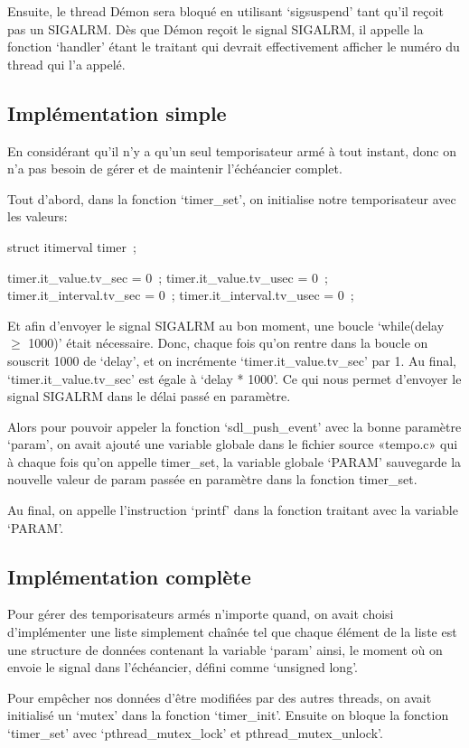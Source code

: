 \documentclass{article}
\begin{document}
Ensuite, le thread Démon sera bloqué en utilisant ‘sigsuspend’ tant qu’il reçoit pas un SIGALRM.
Dès que Démon reçoit le signal SIGALRM, il appelle la fonction ‘handler’ étant le traitant qui devrait effectivement afficher le numéro du thread qui l’a appelé.

\subsection{Implémentation simple}

En considérant qu’il n’y a qu’un seul temporisateur armé à tout instant, donc on n’a pas besoin de gérer et de maintenir l’échéancier complet. 

Tout d’abord, dans la fonction ‘timer\_set’, on initialise notre temporisateur avec les valeurs:

struct itimerval timer ;

timer.it\_value.tv\_sec = 0 ;
timer.it\_value.tv\_usec = 0 ;
timer.it\_interval.tv\_sec = 0 ;
timer.it\_interval.tv\_usec = 0 ;

Et afin d’envoyer le signal SIGALRM au bon moment, une boucle ‘while(delay $\ge$ 1000)’ était nécessaire. Donc, chaque fois qu’on rentre dans la boucle on souscrit 1000 de ‘delay’, et on incrémente  ‘timer.it\_value.tv\_sec’ par 1. Au final, ‘timer.it\_value.tv\_sec’ est égale à ‘delay * 1000’.
Ce qui nous permet d’envoyer le signal SIGALRM dans le délai passé en paramètre.

Alors pour pouvoir appeler la fonction ‘sdl\_push\_event’ avec la bonne paramètre ‘param’, on avait ajouté une variable globale dans le fichier source «tempo.c» qui à chaque fois qu’on appelle timer\_set, la variable globale ‘PARAM’ sauvegarde la nouvelle valeur de param passée en paramètre dans la fonction timer\_set.

Au final, on appelle l’instruction ‘printf’ dans la fonction traitant avec la variable ‘PARAM’.

\subsection{Implémentation complète}

Pour gérer des temporisateurs armés n’importe quand, on avait choisi d’implémenter une liste simplement chaînée tel que chaque élément de la liste est une structure de données contenant la variable ‘param’ ainsi, le moment où on envoie le signal dans l’échéancier, défini comme ‘unsigned long’.

Pour empêcher nos données d’être modifiées par des autres threads, on avait initialisé un ‘mutex’ dans la fonction ‘timer\_init’. Ensuite on bloque la fonction ‘timer\_set’ avec ‘pthread\_mutex\_lock’ et pthread\_mutex\_unlock’.
\end{document}
